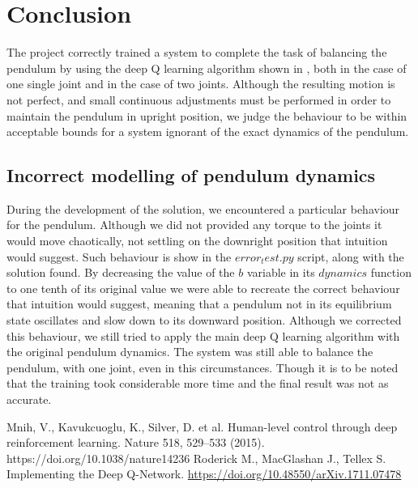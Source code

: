 \documentclass[twocolumn, a4paper]{article}
\begin{document}
\section{Conclusion}
The project correctly trained a system to complete the task of balancing the
pendulum by using the deep Q learning algorithm shown in \cite{Mnih}, both
in the case of one single joint and in the case of two joints. Although the
resulting motion is not perfect, and small continuous adjustments must be
performed in order to maintain the pendulum in upright position, we judge the
behaviour to be within acceptable bounds for a system ignorant of the exact
dynamics of the pendulum.

\subsection{Incorrect modelling of pendulum dynamics}
During the development of the solution, we encountered a particular behaviour
for the pendulum. Although we did not provided any torque to the joints it would
move chaotically, not settling on the downright position that intuition would
suggest. Such behaviour is show in the $error_test.py$ script, along with the
solution found. By decreasing the value of the $b$ variable in its $dynamics$
function to one tenth of its original value we were able to recreate the correct
behaviour that intuition would suggest, meaning that a pendulum not in its
equilibrium state oscillates and slow down to its downward position. Although
we corrected this behaviour, we still tried to apply the main deep Q learning
algorithm with the original pendulum dynamics. The system was still able to
balance the pendulum, with one joint, even in this circumstances. Though it is
to be noted that the training took considerable more time and the final
result was not as accurate.

\begin{thebibliography}{9}
	Mnih, V., Kavukcuoglu, K., Silver, D. et al. Human-level control through
	deep reinforcement learning. Nature 518, 529–533 (2015).
	https://doi.org/10.1038/nature14236
	Roderick M., MacGlashan J., Tellex S. Implementing the Deep Q-Network.
	\href{https://doi.org/10.48550/arXiv.1711.07478}
		 {https://doi.org/10.48550/arXiv.1711.07478}
\end{thebibliography}
\end{document}
